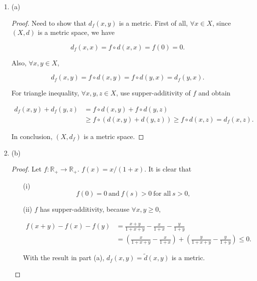 \documentclass[12pt]{article}
\begin{document}
\begin{enumerate}
\item (a)

\begin{proof}
Need to show that $d_f(x, y)$ is a metric. First of all, $\forall x \in X$, since $(X, d)$ is a metric space, we have

$$
d_f(x, x) = f \circ d(x, x) = f(0) = 0.
$$

Also, $\forall x, y \in X$, 

$$
d_f(x, y) = f\circ d(x, y) = f \circ d(y, x) = d_f(y, x).
$$

For triangle inequality, $\forall x, y, z \in X$, use supper-additivity of $f$ and obtain

$$
\begin{aligned}
d_f(x, y) + d_f(y, z) & = f\circ d(x, y) + f\circ d(y, z) \\
& \geqslant f\circ (d(x, y) + d(y, z)) \geqslant f\circ d(x, z) = d_f(x, z).
\end{aligned}
$$

In conclusion, $(X, d_f)$ is a metric space.

\end{proof}

\item (b)

\begin{proof}

Let $f: \mathbb{R}_+ \rightarrow \mathbb{R}_+$. $f(x) = x/(1 + x)$. It is clear that 
\begin{enumerate}
\item [(i)]
$$
f(0) = 0\ \text{and}\  f(s) > 0 \ \text{for all}\  s>0,
$$

\item [(ii)]
$f$ has supper-additivity, because $\forall x, y \geqslant 0$, 

$$
\begin{aligned}
f(x + y) - f(x) - f(y) & = \frac{x+y}{1+x+y} - \frac{x}{1+x} - \frac{y}{1+y} \\
& = \left( \frac{x}{1+x+y} - \frac{x}{1+x} \right) + \left( \frac{y}{1+x+y} - \frac{y}{1+y} \right) \leqslant 0.
\end{aligned}
$$

With the result in part (a), $d_f(x, y) = \tilde{d}(x, y)$ is a metric.

\end{enumerate}

\end{proof}

\end{enumerate}
\end{document}
